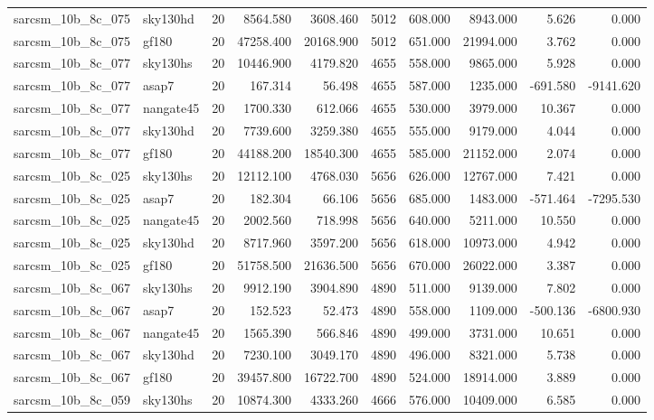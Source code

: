 \begin{tabular}{llrrrrrrrr}
sarcsm\_10b\_8c\_075 & sky130hd & 20 & 8564.580 & 3608.460 & 5012 & 608.000 & 8943.000 & 5.626 & 0.000 \\
sarcsm\_10b\_8c\_075 & gf180 & 20 & 47258.400 & 20168.900 & 5012 & 651.000 & 21994.000 & 3.762 & 0.000 \\
sarcsm\_10b\_8c\_077 & sky130hs & 20 & 10446.900 & 4179.820 & 4655 & 558.000 & 9865.000 & 5.928 & 0.000 \\
sarcsm\_10b\_8c\_077 & asap7 & 20 & 167.314 & 56.498 & 4655 & 587.000 & 1235.000 & -691.580 & -9141.620 \\
sarcsm\_10b\_8c\_077 & nangate45 & 20 & 1700.330 & 612.066 & 4655 & 530.000 & 3979.000 & 10.367 & 0.000 \\
sarcsm\_10b\_8c\_077 & sky130hd & 20 & 7739.600 & 3259.380 & 4655 & 555.000 & 9179.000 & 4.044 & 0.000 \\
sarcsm\_10b\_8c\_077 & gf180 & 20 & 44188.200 & 18540.300 & 4655 & 585.000 & 21152.000 & 2.074 & 0.000 \\
sarcsm\_10b\_8c\_025 & sky130hs & 20 & 12112.100 & 4768.030 & 5656 & 626.000 & 12767.000 & 7.421 & 0.000 \\
sarcsm\_10b\_8c\_025 & asap7 & 20 & 182.304 & 66.106 & 5656 & 685.000 & 1483.000 & -571.464 & -7295.530 \\
sarcsm\_10b\_8c\_025 & nangate45 & 20 & 2002.560 & 718.998 & 5656 & 640.000 & 5211.000 & 10.550 & 0.000 \\
sarcsm\_10b\_8c\_025 & sky130hd & 20 & 8717.960 & 3597.200 & 5656 & 618.000 & 10973.000 & 4.942 & 0.000 \\
sarcsm\_10b\_8c\_025 & gf180 & 20 & 51758.500 & 21636.500 & 5656 & 670.000 & 26022.000 & 3.387 & 0.000 \\
sarcsm\_10b\_8c\_067 & sky130hs & 20 & 9912.190 & 3904.890 & 4890 & 511.000 & 9139.000 & 7.802 & 0.000 \\
sarcsm\_10b\_8c\_067 & asap7 & 20 & 152.523 & 52.473 & 4890 & 558.000 & 1109.000 & -500.136 & -6800.930 \\
sarcsm\_10b\_8c\_067 & nangate45 & 20 & 1565.390 & 566.846 & 4890 & 499.000 & 3731.000 & 10.651 & 0.000 \\
sarcsm\_10b\_8c\_067 & sky130hd & 20 & 7230.100 & 3049.170 & 4890 & 496.000 & 8321.000 & 5.738 & 0.000 \\
sarcsm\_10b\_8c\_067 & gf180 & 20 & 39457.800 & 16722.700 & 4890 & 524.000 & 18914.000 & 3.889 & 0.000 \\
sarcsm\_10b\_8c\_059 & sky130hs & 20 & 10874.300 & 4333.260 & 4666 & 576.000 & 10409.000 & 6.585 & 0.000 \\

\end{tabular}
